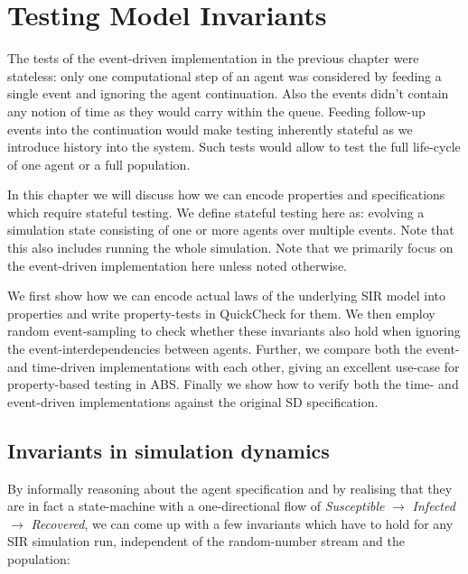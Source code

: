\chapter{Testing Model Invariants}
\label{ch:sir_invariants}

The tests of the event-driven implementation in the previous chapter were stateless: only one computational step of an agent was considered by feeding a single event and ignoring the agent continuation. Also the events didn't contain any notion of time as they would carry within the queue. Feeding follow-up events into the continuation would make testing inherently stateful as we introduce history into the system. Such tests would allow to test the full life-cycle of one  agent or a full population.

In this chapter we will discuss how we can encode properties and specifications which require stateful testing. We define stateful testing here as: evolving a simulation state consisting of one or more agents over multiple events. Note that this also includes running the whole simulation. Note that we primarily focus on the event-driven implementation here unless noted otherwise.

We first show how we can encode actual laws of the underlying SIR model into properties and write property-tests in QuickCheck for them. We then employ random event-sampling to check whether these invariants also hold when ignoring the event-interdependencies between agents. Further, we compare both the event- and time-driven implementations with each other, giving an excellent use-case for property-based testing in ABS. Finally we show how to verify both the time- and event-driven implementations against the original SD specification.

\section{Invariants in simulation dynamics}
\label{sec:prop_invariants_dynamics}
By informally reasoning about the agent specification and by realising that they are in fact a state-machine with a one-directional flow of \textit{Susceptible} $\rightarrow$ \textit{Infected} $\rightarrow$ \textit{Recovered}, we can come up with a few invariants which have to hold for any SIR simulation run, independent of the random-number stream and the population:

